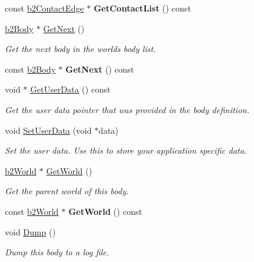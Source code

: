 \begin{DoxyCompactItemize}
\item 
\mbox{\label{classb2_body_a137168690469fb838ab89c5f27a7cf43}} 
const \hyperlink{structb2_contact_edge}{b2\+Contact\+Edge} $\ast$ {\bfseries Get\+Contact\+List} () const
\item 
\mbox{\label{classb2_body_ad54182a11d02362b027a0eb072775bdc}} 
\hyperlink{classb2_body}{b2\+Body} $\ast$ \hyperlink{classb2_body_ad54182a11d02362b027a0eb072775bdc}{Get\+Next} ()
\begin{DoxyCompactList}\small\item\em Get the next body in the world\textquotesingle{}s body list. \end{DoxyCompactList}\item 
\mbox{\label{classb2_body_aa118d06e0ae6444c02bb5d22bb448269}} 
const \hyperlink{classb2_body}{b2\+Body} $\ast$ {\bfseries Get\+Next} () const
\item 
\mbox{\label{classb2_body_a672c782f7184faf3d673b08681dd63e3}} 
void $\ast$ \hyperlink{classb2_body_a672c782f7184faf3d673b08681dd63e3}{Get\+User\+Data} () const
\begin{DoxyCompactList}\small\item\em Get the user data pointer that was provided in the body definition. \end{DoxyCompactList}\item 
\mbox{\label{classb2_body_a5553a5ecdfd2d7200ba2405ce6043f52}} 
void \hyperlink{classb2_body_a5553a5ecdfd2d7200ba2405ce6043f52}{Set\+User\+Data} (void $\ast$data)
\begin{DoxyCompactList}\small\item\em Set the user data. Use this to store your application specific data. \end{DoxyCompactList}\item 
\mbox{\label{classb2_body_abfd9466763b20977f9122d0e162dfeb9}} 
\hyperlink{classb2_world}{b2\+World} $\ast$ \hyperlink{classb2_body_abfd9466763b20977f9122d0e162dfeb9}{Get\+World} ()
\begin{DoxyCompactList}\small\item\em Get the parent world of this body. \end{DoxyCompactList}\item 
\mbox{\label{classb2_body_a7e0fc2b91fbfc11da467700fd0792088}} 
const \hyperlink{classb2_world}{b2\+World} $\ast$ {\bfseries Get\+World} () const
\item 
\mbox{\label{classb2_body_ac9e482f7d9df92801c24e79a7e751d06}} 
void \hyperlink{classb2_body_ac9e482f7d9df92801c24e79a7e751d06}{Dump} ()
\begin{DoxyCompactList}\small\item\em Dump this body to a log file. \end{DoxyCompactList}\end{DoxyCompactItemize}
